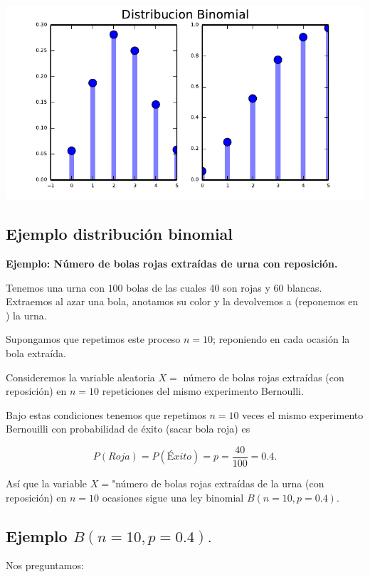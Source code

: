 \documentclass[]{book}
\begin{document}
\includegraphics{curso-probabilidad-udemy_files/figure-latex/dibu_python2-1.pdf}

\hypertarget{ejemplo-distribuciuxf3n-binomial}{%
\subsection{Ejemplo distribución binomial}\label{ejemplo-distribuciuxf3n-binomial}}

\textbf{Ejemplo: Número de bolas rojas extraídas de urna con reposición.}

Tenemos una urna con \(100\) bolas de las cuales 40 son rojas y 60 blancas. Extraemos al azar una bola, anotamos su color y la devolvemos a (reponemos en ) la urna.

Supongamos que repetimos este proceso \(n=10\); reponiendo en cada ocasión la bola extraída.

Consideremos la variable aleatoria \(X=\) número de bolas rojas extraídas (con reposición) en \(n=10\) repeticiones del mismo experimento Bernoulli.

Bajo estas condiciones tenemos que repetimos \(n=10\) veces el mismo experimento Bernouilli con probabilidad de éxito (sacar bola roja) es

\[P(Roja)=P(Éxito)=p=\frac{40}{100}=0.4.\]

Así que la variable \(X=\)"número de bolas rojas extraídas de la urna (con reposición) en \(n=10\) ocasiones sigue una ley binomial \(B(n=10,p=0.4).\)

\hypertarget{ejemplo-bn10p0.4.}{%
\subsection{\texorpdfstring{Ejemplo \(B(n=10,p=0.4).\)}{Ejemplo B(n=10,p=0.4).}}\label{ejemplo-bn10p0.4.}}

Nos preguntamos:
\end{document}
